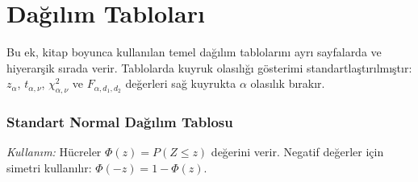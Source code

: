 \chapter{Dağılım Tabloları}
Bu ek, kitap boyunca kullanılan temel dağılım tablolarını ayrı sayfalarda ve hiyerarşik sırada verir. Tablolarda kuyruk olasılığı gösterimi standartlaştırılmıştır: $z_\alpha$, $t_{\alpha,\nu}$, $\chi^2_{\alpha,\nu}$ ve $F_{\alpha,d_1,d_2}$ değerleri sağ kuyrukta $\alpha$ olasılık bırakır.


\clearpage
\subsection{Standart Normal Dağılım Tablosu}
\textit{Kullanım:} Hücreler $\Phi(z)=P(Z\le z)$ değerini verir. Negatif değerler için simetri kullanılır: $\Phi(-z)=1-\Phi(z)$.

